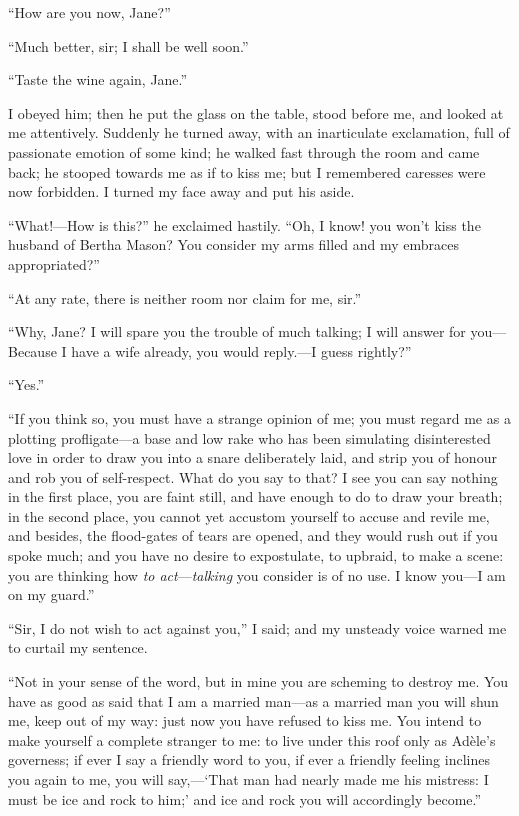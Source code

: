 \enquote{How are you now, Jane?}

\enquote{Much better, sir; I shall be well soon.}

\enquote{Taste the wine again, Jane.}

I obeyed him; then he put the glass on the table, stood before me, and
looked at me attentively. Suddenly he turned away, with an inarticulate
exclamation, full of passionate emotion of some kind; he walked fast
through the room and came back; he stooped towards me as if to kiss me;
but I remembered caresses were now forbidden. I turned my face away and
put his aside.

\enquote{What!---How is this?} he exclaimed hastily. \enquote{Oh, I
	know! you won't kiss the husband of Bertha Mason? You consider my arms
	filled and my embraces appropriated?}

\enquote{At any rate, there is neither room nor claim for me, sir.}

\enquote{Why, Jane? I will spare you the trouble of much talking; I
	will answer for you---Because I have a wife already, you would
	reply.---I guess rightly?}

\enquote{Yes.}

\enquote{If you think so, you must have a strange opinion of me; you must
	regard me as a plotting profligate---a base and low rake who has been
	simulating disinterested love in order to draw you into a snare
	deliberately laid, and strip you of honour and rob you of self-respect.
	What do you say to that? I see you can say nothing in the first place,
	you are faint still, and have enough to do to draw your breath; in the
	second place, you cannot yet accustom yourself to accuse and revile me,
	and besides, the flood-gates of tears are opened, and they would rush
	out if you spoke much; and you have no desire to expostulate, to
	upbraid, to make a scene: you are thinking how \emph{to
		act}---\emph{talking} you consider is of no use. I know you---I am on
	my guard.}

\enquote{Sir, I do not wish to act against you,} I said; and my unsteady
voice warned me to curtail my sentence.

\enquote{Not in your sense of the word, but in mine you are scheming to
	destroy me. You have as good as said that I am a married man---as a
	married man you will shun me, keep out of my way: just now you have
	refused to kiss me. You intend to make yourself a complete stranger to
	me: to live under this roof only as Adèle's governess; if ever I say a
	friendly word to you, if ever a friendly feeling inclines you again to
	me, you will say,---\enquote{That man had nearly made me his mistress: I must be
		ice and rock to him;} and ice and rock you will accordingly become.}

